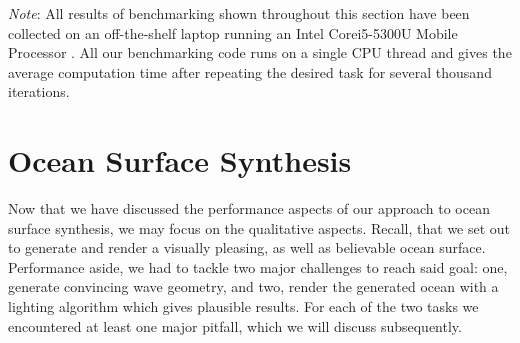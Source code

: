 \emph{Note}: All results of benchmarking shown throughout this section
have been collected on an off-the-shelf laptop running an Intel\textregistered
Core\texttrademark i5-5300U Mobile Processor \citep{intel:5300u}.
All our benchmarking code runs on a single CPU thread and gives the average
computation time after repeating the desired task for several thousand iterations.
%
\section{Ocean Surface Synthesis}
\label{sec:results:synthesis}
Now that we have discussed the performance aspects of our approach
to ocean surface synthesis, we may focus on the qualitative aspects.
Recall, that we set out to generate and render a visually pleasing,
as well as believable ocean surface. Performance aside, we had to tackle two
major challenges to reach said goal: one, generate convincing wave geometry, and two, 
render the generated ocean with a lighting algorithm which gives plausible results.
For each of the two tasks we encountered at least one major pitfall, which we will
discuss subsequently.
